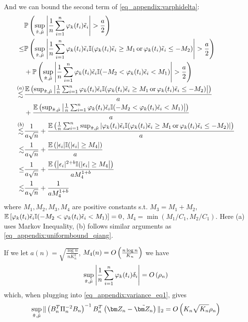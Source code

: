 And we can bound the second term of \eqref{eq_appendix:varphidelta}:
\begin{equation*}
\begin{split}
&\P\left(\sup_{\hat{\pi},\hat\mu}\left|\frac{1}{n}\sum_{i=1}^n\varphi_k(t_i)\tilde\epsilon_i\right|>\frac{a}{2}\right)
\\\leq& \P\left(\sup_{\hat{\pi},\hat\mu}\left|\frac{1}{n}\sum_{i=1}^n\varphi_k(t_i)\tilde\epsilon_i\I(\varphi_k(t_i)\tilde\epsilon_i\geq M_1\,\text{or}\,\varphi_k(t_i)\tilde\epsilon_i\leq -M_2)\right|>\frac{a}{2}\right)
\\&+\P\left(\sup_{\hat{\pi},\hat\mu}\left|\frac{1}{n}\sum_{i=1}^n\varphi_k(t_i)\tilde\epsilon_i\I(-M_2<\varphi_k(t_i)\tilde\epsilon_i< M_1)\right|>\frac{a}{2}\right)
\\\overset{(a)}{\lesssim}&
\frac{\E\left(\sup_{\hat{\pi},\hat\mu}\left|\frac{1}{n}\sum_{i=1}^n\varphi_k(t_i)\tilde\epsilon_i\I(\varphi_k(t_i)\tilde\epsilon_i\geq M_1\,\text{or}\,\varphi_k(t_i)\tilde\epsilon_i\leq -M_2)\right|\right)}{a}
\\&+\frac{\E\left(\sup_{\hat{\pi},\hat\mu}\left|\frac{1}{n}\sum_{i=1}^n\varphi_k(t_i)\tilde\epsilon_i\I(-M_2<\varphi_k(t_i)\tilde\epsilon_i< M_1)\right|\right)}{a}
\\\overset{(b)}{\lesssim}&
\frac{1}{a\sqrt{n}}+\frac{\E\left(\frac{1}{n}\sum_{i=1}^n\sup_{\hat{\pi},\hat\mu}\left|\varphi_k(t_i)\tilde\epsilon_i\I(\varphi_k(t_i)\tilde\epsilon_i\geq M_1\,\text{or}\,\varphi_k(t_i)\tilde\epsilon_i\leq -M_2)\right|\right)}{a}
\\\lesssim&
\frac{1}{a\sqrt{n}}+\frac{\E\left(\left|\epsilon_i|\I(|\epsilon_i|\geq M_4\right|\right)}{a}
\\\leq&
\frac{1}{a\sqrt{n}}+\frac{\E\left(\left|\epsilon_i|^{2+b}\I(|\epsilon_i|\geq M_4\right|\right)}{aM_4^{1+b}}
\\\lesssim&
\frac{1}{a\sqrt{n}}+\frac{1}{aM_4^{1+b}}
\end{split}
\end{equation*}
where $M_1,M_2,M_3,M_4$ are positive constants s.t. $M_3=M_1+M_2$, $\mathbb{E}\left[\varphi_k(t_i)\tilde\epsilon_i\mathbb{I}(-M_2<\varphi_k(t_i)\tilde\epsilon_i< M_1)\right]=0$, $M_4=\min(M_1/C_1,M_2/C_1)$. Here (a) uses Markov Inequality, (b) follows similar arguments as \eqref{eq_appendix:uniformbound_qiang}. 

If we let $a(n)=\sqrt{\frac{\log n}{nK_n^2}}$, $M_4(n)=O\left(\frac{n\log n}{K_n}\right)$ we have
\begin{align*}
\sup_{\hat{\pi},\hat\mu}\left|\frac{1}{n}\sum_{i=1}^n\varphi_k(t_i)\delta_i\right|
=O\left(\rho_n\right)
\end{align*}
which, when plugging into \eqref{eq_appendix:variance_eq1}, gives
\begin{align}
\sup_{\hat{\pi},\hat\mu}\|\left(B_n^T\Pi_n^{-2}B_n\right)^{-1}B_n^T\left(\Zn-\tilde\Zn\right)\|_2=\O\left(K_n\sqrt{K_n}\rho_n\right)
\end{align}


